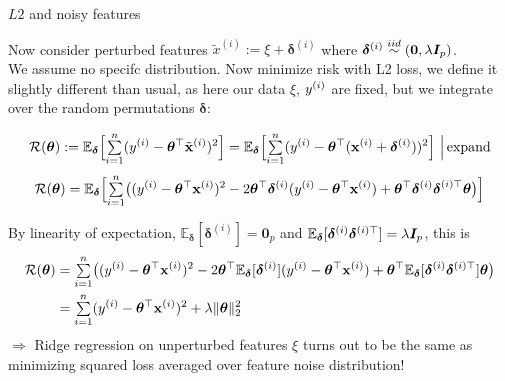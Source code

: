 \documentclass[11pt,compress,t,notes=noshow, xcolor=table]{beamer}
\begin{document}
\begin{vbframe}{$L2$ and noisy features}
\begin{footnotesize}
Now consider perturbed features $ \tilde{x}^{(i)}:= \xi + \bm{\delta}^{(i)}$ where $\bm{\delta}^{(i)} \overset{iid}{\sim} (\bm{0},\lambda \boldsymbol{I}_p)$. \\
We assume no specifc distribution. Now minimize risk with L2 loss, we define it slightly different than usual, as here our data $\xi$, $y^{(i)}$ are fixed, but we integrate over the random permutations $\bm{\delta}$:


$$\mathcal{R}(\bm{\theta}):= \mathbb{E}_{\bm{\delta}}\Big[{\textstyle \sum\limits_{i=1}^n}(y^{(i)}-\bm{\theta}^{\top}\tilde{\mathbf{x}}^{(i)})^2\Big] = \mathbb{E}_{\bm{\delta}}\Big[{\textstyle \sum\limits_{i=1}^n}(y^{(i)}-\bm{\theta}^{\top}(\mathbf{x}^{(i)}+\bm{\delta}^{(i)}))^2\Big]\,\,\Big|\, \text{expand}$$
\vspace{-0.2cm}
$$\mathcal{R}(\bm{\theta}) = \mathbb{E}_{\bm{\delta}}\Big[{\textstyle \sum\limits_{i=1}^n}\big((y^{(i)}-\bm{\theta}^{\top}\mathbf{x}^{(i)})^2 - 2 \bm{\theta}^{\top}\bm{\delta}^{(i)}(y^{(i)}-\bm{\theta}^{\top}\mathbf{x}^{(i)}) + \bm{\theta}^{\top}\bm{\delta}^{(i)}\bm{{\delta}}^{(i) \top}\bm{\theta}\big)\Big]$$

By linearity of expectation, $\mathbb{E}_{\bm{\delta}}[\bm{\delta}^{(i)}]=\bm{0}_p$ and $\mathbb{E}_{\bm{\delta}}[\bm{\delta}^{(i)}\bm{\delta}^{(i)\top}]=\lambda \boldsymbol{I}_p$, this is
\vspace{-0.2cm}
%
\begin{align*}\mathcal{R}(\bm{\theta})&={\textstyle \sum\limits_{i=1}^n}\big((y^{(i)}-\bm{\theta}^{\top}\mathbf{x}^{(i)})^2 - 2 \bm{\theta}^{\top}\mathbb{E}_{\bm{\delta}}[\bm{\delta}^{(i)}](y^{(i)}-\bm{\theta}^{\top}\mathbf{x}^{(i)}) + \bm{\theta}^{\top}\mathbb{E}_{\bm{\delta}}[\bm{\delta}^{(i)}\bm{\delta}^{(i)\top}]\bm{\theta} \big) \\
&= {\textstyle \sum\limits_{i=1}^n}(y^{(i)}-\bm{\theta}^{\top}\mathbf{x}^{(i)})^2+\lambda \Vert \bm{\theta} \Vert_2^2
\end{align*}
$\Longrightarrow$ Ridge regression on unperturbed features {\small $\xi$} turns out to be the same as minimizing squared loss averaged over feature noise distribution!

\end{footnotesize}

\end{vbframe}



\endlecture
\end{document}
